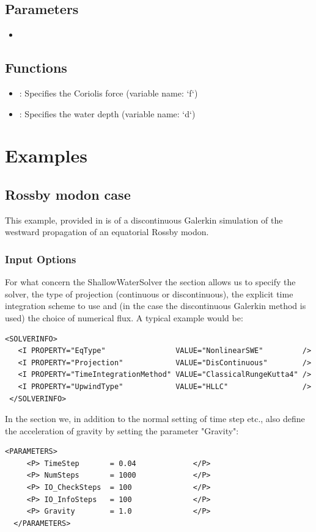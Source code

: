 \subsection{Parameters}
\begin{itemize}
\item {}
\end{itemize}

\subsection{Functions}
\begin{itemize}
\item {}: Specifies the Coriolis force (variable name: `f`)
\item {}: Specifies the water depth (variable name: `d`)
\end{itemize}

\section{Examples}
\subsection{Rossby modon case}
This example, provided in  is of a
discontinuous Galerkin simulation of the westward propagation of an equatorial
Rossby modon.


\subsubsection{Input Options}

For what concern the ShallowWaterSolver the
 section allows us to specify the solver, the type of
projection (continuous or discontinuous), the explicit time integration scheme to
use and (in the case the discontinuous Galerkin method is used) 
the choice of numerical flux. A typical example would be:
\begin{lstlisting}[style=XmlStyle]
 <SOLVERINFO>
   <I PROPERTY="EqType"                VALUE="NonlinearSWE"         />
   <I PROPERTY="Projection"            VALUE="DisContinuous"        />
   <I PROPERTY="TimeIntegrationMethod" VALUE="ClassicalRungeKutta4" />
   <I PROPERTY="UpwindType"            VALUE="HLLC"                 />
 </SOLVERINFO>
\end{lstlisting}

In the  section we, in addition to the normal setting
of time step etc., also define the acceleration of gravity by 
setting the parameter "Gravity": 
\begin{lstlisting}[style=XmlStyle]
  <PARAMETERS>
     <P> TimeStep       = 0.04             </P>
     <P> NumSteps       = 1000             </P>
     <P> IO_CheckSteps  = 100              </P>
     <P> IO_InfoSteps   = 100              </P>
     <P> Gravity        = 1.0              </P>
  </PARAMETERS>
\end{lstlisting}

